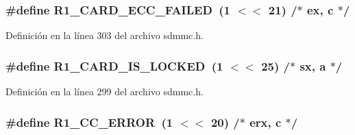 \subsubsection[{\texorpdfstring{R1\+\_\+\+C\+A\+R\+D\+\_\+\+E\+C\+C\+\_\+\+F\+A\+I\+L\+ED}{R1_CARD_ECC_FAILED}}]{\setlength{\rightskip}{0pt plus 5cm}\#define R1\+\_\+\+C\+A\+R\+D\+\_\+\+E\+C\+C\+\_\+\+F\+A\+I\+L\+ED~(1 $<$$<$ 21)	/$\ast$ ex, c $\ast$/}\hypertarget{group___c_h_i_p___s_d_m_m_c___definitions_ga033c9ace264d00558c662a51cd7b1333}{}\label{group___c_h_i_p___s_d_m_m_c___definitions_ga033c9ace264d00558c662a51cd7b1333}


Definición en la línea 303 del archivo sdmmc.\+h.

\subsubsection[{\texorpdfstring{R1\+\_\+\+C\+A\+R\+D\+\_\+\+I\+S\+\_\+\+L\+O\+C\+K\+ED}{R1_CARD_IS_LOCKED}}]{\setlength{\rightskip}{0pt plus 5cm}\#define R1\+\_\+\+C\+A\+R\+D\+\_\+\+I\+S\+\_\+\+L\+O\+C\+K\+ED~(1 $<$$<$ 25)	/$\ast$ sx, a $\ast$/}\hypertarget{group___c_h_i_p___s_d_m_m_c___definitions_ga249bcd9a38ba41b3829bca4094a5ecfd}{}\label{group___c_h_i_p___s_d_m_m_c___definitions_ga249bcd9a38ba41b3829bca4094a5ecfd}


Definición en la línea 299 del archivo sdmmc.\+h.

\subsubsection[{\texorpdfstring{R1\+\_\+\+C\+C\+\_\+\+E\+R\+R\+OR}{R1_CC_ERROR}}]{\setlength{\rightskip}{0pt plus 5cm}\#define R1\+\_\+\+C\+C\+\_\+\+E\+R\+R\+OR~(1 $<$$<$ 20)	/$\ast$ erx, c $\ast$/}\hypertarget{group___c_h_i_p___s_d_m_m_c___definitions_ga9a883bb45fb1dfb3dac19a63d11c410b}{}\label{group___c_h_i_p___s_d_m_m_c___definitions_ga9a883bb45fb1dfb3dac19a63d11c410b}


